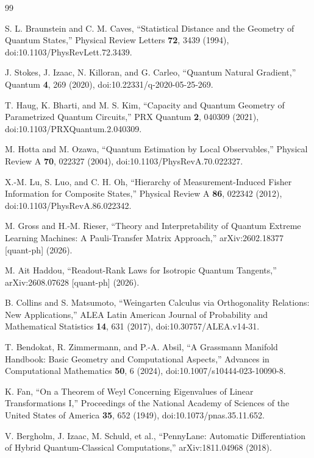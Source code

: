 \begin{thebibliography}{99}

S. L. Braunstein and C. M. Caves,
``Statistical Distance and the Geometry of Quantum States,''
Physical Review Letters \textbf{72}, 3439 (1994), doi:10.1103/PhysRevLett.72.3439.

J. Stokes, J. Izaac, N. Killoran, and G. Carleo,
``Quantum Natural Gradient,''
Quantum \textbf{4}, 269 (2020), doi:10.22331/q-2020-05-25-269.

T. Haug, K. Bharti, and M. S. Kim,
``Capacity and Quantum Geometry of Parametrized Quantum Circuits,''
PRX Quantum \textbf{2}, 040309 (2021), doi:10.1103/PRXQuantum.2.040309.

M. Hotta and M. Ozawa,
``Quantum Estimation by Local Observables,''
Physical Review A \textbf{70}, 022327 (2004), doi:10.1103/PhysRevA.70.022327.

X.-M. Lu, S. Luo, and C. H. Oh,
``Hierarchy of Measurement-Induced Fisher Information for Composite States,''
Physical Review A \textbf{86}, 022342 (2012), doi:10.1103/PhysRevA.86.022342.

M. Gross and H.-M. Rieser,
``Theory and Interpretability of Quantum Extreme Learning Machines: A Pauli-Transfer Matrix Approach,''
arXiv:2602.18377 [quant-ph] (2026).

M. Ait Haddou,
``Readout-Rank Laws for Isotropic Quantum Tangents,''
arXiv:2608.07628 [quant-ph] (2026).

B. Collins and S. Matsumoto,
``Weingarten Calculus via Orthogonality Relations: New Applications,''
ALEA Latin American Journal of Probability and Mathematical Statistics \textbf{14}, 631 (2017), doi:10.30757/ALEA.v14-31.

T. Bendokat, R. Zimmermann, and P.-A. Absil,
``A Grassmann Manifold Handbook: Basic Geometry and Computational Aspects,''
Advances in Computational Mathematics \textbf{50}, 6 (2024), doi:10.1007/s10444-023-10090-8.

K. Fan,
``On a Theorem of Weyl Concerning Eigenvalues of Linear Transformations I,''
Proceedings of the National Academy of Sciences of the United States of America \textbf{35}, 652 (1949), doi:10.1073/pnas.35.11.652.

V. Bergholm, J. Izaac, M. Schuld, et al.,
``PennyLane: Automatic Differentiation of Hybrid Quantum-Classical Computations,''
arXiv:1811.04968 (2018).


\end{thebibliography}
